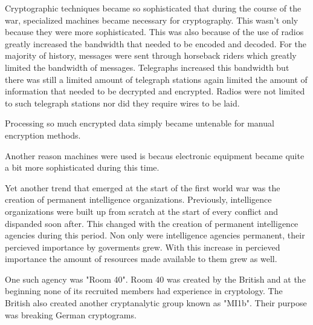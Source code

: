 \documentclass{article}
\begin{document}
    Cryptographic techniques became so sophisticated that during the course of the war,
    specialized machines became necessary for cryptography. This wasn't only because
    they were more sophisticated. This was also because of the use of radios greatly
    increased the bandwidth that needed to be encoded and decoded. For the majority of
    history, messages were sent through horseback riders which greatly limited the bandwidth
    of messages. Telegraphs increased this bandwidth but there was still a limited amount
    of telegraph stations again limited the amount of information that needed
    to be decrypted and encrypted. Radios were not limited to such telegraph stations
    nor did they require wires to be laid.

    Processing so much encrypted data simply became untenable for manual encryption methods.
    
    Another reason machines were used is becaus electronic equipment became quite a bit
    more sophisticated during this time.

    Yet another trend that emerged at the start of the first world war was the
    creation of permanent intelligence organizations. Previously, intelligence organizations
    were built up from scratch at the start of every conflict and dispanded soon after.
    This changed with the creation of permanent intelligence agencies during this period.
    Non only were intelligence agencies permanent, their percieved importance by goverments
    grew. With this increase in percieved importance the amount of resources made available
    to them grew as well.

    One such agency was "Room 40". Room 40 was created by the British and at the beginning
    none of its recruited members had experience in cryptology. The British also
    created another cryptanalytic group known as "MI1b". Their purpose was breaking
    German cryptograms.
\end{document}
